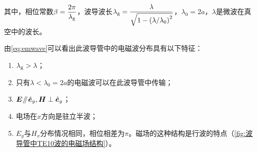 		其中，相位常数$\beta =\dfrac{2\pi}{\lambda_{\rm g}}$，波导波长$\lambda_{\rm g}=\dfrac{\lambda}{\sqrt{1-\left(\lambda /\lambda_0\right)^2}}$，$\lambda_0 = 2a$，$\lambda$是微波在真空中的波长。
		\par 由\cref{eq:emwave}可以看出此波导管中的电磁波分布具有以下特征：
		\begin{enumerate}
			\item $\lambda_{\rm g} >\lambda$；
			\item 只有$\lambda <\lambda_0=2a$的电磁波可以在此波导管中传输；
			\item $\boldsymbol{E}\mathbin{\!/\mkern-5mu/\!}\hat{\boldsymbol{e}}_{y},\boldsymbol{H}\perp\hat{\boldsymbol{e}}_{y}$；
			\item 电场在$x$方向是驻立半波；
			\item $E_y$与$H_x$分布情况相同，相位相差为$\pi$。磁场的这种结构是行波的特点（\cref{fig:波导管中TE10波的电磁场结构}）。
		\end{enumerate}
